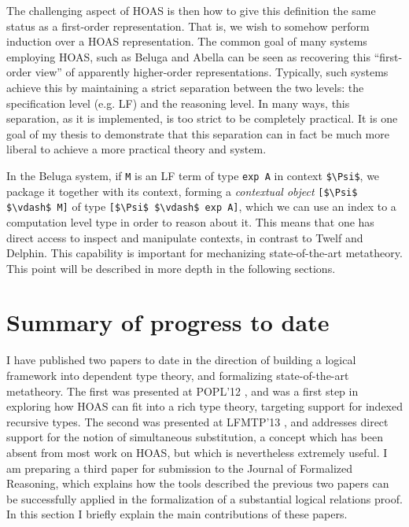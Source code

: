 \documentclass{article}
\begin{document}
The challenging aspect of HOAS is then how to give this definition the same
status as a first-order representation. That is, we wish to somehow
perform induction over a HOAS representation. The
common goal of many systems employing HOAS, such as Beluga \citep{Pientka:IJCAR10} and
Abella \citep{Gacek:IJCAR08} can be seen as recovering this ``first-order view'' of
apparently higher-order representations. Typically, such systems
achieve this by maintaining a strict separation between the two
levels: the specification level (e.g. LF) and the reasoning level. In many ways, this
separation, as it is implemented, is too strict to be completely practical. It is one goal of
my thesis to demonstrate that this separation can in fact
be much more liberal to achieve a more practical theory and system.

In the Beluga system, if \lstinline{M} is an LF term of type
\lstinline{exp A} in context \lstinline{$\Psi$}, we package it
together with its context, forming a \emph{contextual object} \lstinline{[$\Psi$ $\vdash$ M]} of
type \lstinline{[$\Psi$ $\vdash$ exp A]}, which we can use an index to
a computation level type in order to reason
about it. This means that one has direct access to inspect and manipulate
contexts, in contrast to Twelf and Delphin. This capability is important for mechanizing state-of-the-art
metatheory. This point will be described in more depth in the following
sections.

\section{Summary of progress to date}
I have published two papers to date in the direction of building a logical
framework into dependent type theory, and formalizing state-of-the-art
metatheory. The first
was presented at POPL'12 \citep{Cave12} , and was a first step in
exploring how HOAS can fit into a rich type theory, targeting support
for indexed recursive types. The second was presented at LFMTP'13
\citep{Cave13}, and addresses direct support for the notion of
simultaneous substitution, a concept which has been absent from most
work on HOAS, but which is nevertheless extremely useful. I am
preparing a third paper \citep{Cave14} for submission to the Journal
of Formalized Reasoning, which explains how the tools described the
previous two papers can be successfully applied in the formalization
of a substantial logical relations proof. In this
section I briefly explain the main contributions of these papers.
\end{document}
